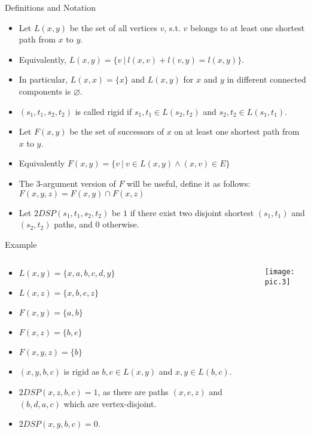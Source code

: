 \documentclass{beamer}
\begin{document}
\begin{frame}{Definitions and Notation}
    \begin{itemize}
        \item Let $L(x, y)$ be the set of all vertices $v$, s.t. $v$ belongs to at least one shortest path from $x$ to $y$.
        \item Equivalently, $L(x, y) = \{v~|~l(x, v) + l(v, y) = l(x, y)\}$.
        \item In particular, $L(x, x) = \{x\}$ and $L(x, y)$ for $x$ and $y$ in different connected components is $\varnothing$.
        \item $(s_1, t_1, s_2, t_2)$ is called rigid if $s_1, t_1 \in L(s_2, t_2)$ and $s_2, t_2 \in L(s_1, t_1)$.
        \item Let $F(x, y)$ be the set of successors of $x$ on at least one shortest path from $x$ to $y$.
        \item Equivalently $F(x, y) = \{v~|~v \in L(x, y) \wedge (x, v) \in E\}$
        \item The 3-argument version of $F$ will be useful, define it as follows: $F(x, y, z) = F(x, y) \cap F(x, z)$
        \item Let $2DSP(s_1, t_1, s_2, t_2)$ be $1$ if there exist two disjoint shortest $(s_1, t_1)$ and $(s_2, t_2)$ paths, and 0 otherwise.
    \end{itemize}
\end{frame}

\begin{frame}{Example}
    \begin{example}
        \begin{columns}
            \begin{column}{0.6\textwidth}
                \begin{itemize}
                    \item $L(x, y) = \{x, a, b, c, d, y\}$
                    \item $L(x, z) = \{x, b, e, z\}$
                    \item $F(x, y) = \{a, b\}$
                    \item $F(x, z) = \{b, e\}$
                    \item $F(x, y, z) = \{b\}$
                    \item $(x, y, b, c)$ is rigid as $b, c \in L(x, y)$ and $x, y \in L(b, c)$. 
                    \item $2DSP(x, z, b, c) = 1$, as there are paths $(x, e, z)$ and $(b, d, a, c)$ which are vertex-disjoint.
                    \item $2DSP(x, y, b, c) = 0$.
                \end{itemize}
            \end{column}
            \begin{column}{0.3\textwidth}
                \texttt{[image: pic.3]}
            \end{column}
        \end{columns}
    \end{example}
\end{frame}
\end{document}
